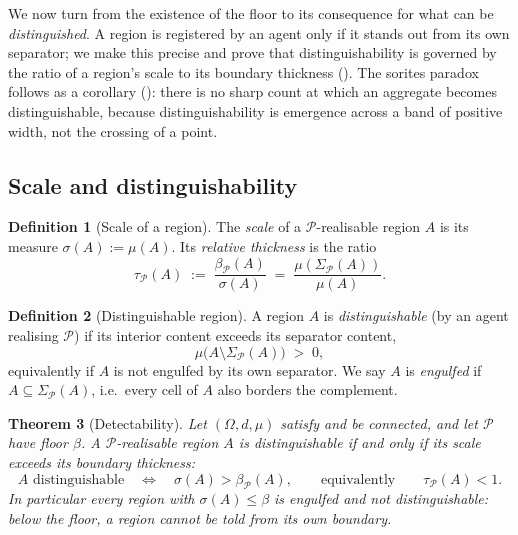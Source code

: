 \documentclass[11pt,a4paper]{article}
\theoremstyle{thmstyle}
\newtheorem{theorem}{Theorem}[section]
\theoremstyle{definition}
\newtheorem{definition}[theorem]{Definition}
\theoremstyle{remark}
\newcommand{\Space}{\Omega}
\newcommand{\thick}{\beta}
\newcommand{\Part}{\mathscr{P}}
\begin{document}
We now turn from the existence of the floor to its consequence for what can be
\emph{distinguished}. A region is registered by an agent only if it stands out
from its own separator; we make this precise and prove that distinguishability is
governed by the ratio of a region's scale to its boundary thickness
(). The sorites paradox follows as a corollary
(): there is no sharp count at which an aggregate becomes
distinguishable, because distinguishability is emergence across a band of
positive width, not the crossing of a point.

\subsection{Scale and distinguishability}

\begin{definition}[Scale of a region]
\label{def:scale}
The \emph{scale} of a $\Part$-realisable region $A$ is its measure
$\sigma(A):=\mu(A)$. Its \emph{relative thickness} is the ratio
\[
\tau_\Part(A)\;:=\;\frac{\thick_\Part(A)}{\sigma(A)}
\;=\;\frac{\mu(\Sigma_\Part(A))}{\mu(A)} .
\]
\end{definition}

\begin{definition}[Distinguishable region]
\label{def:distinguishable}
A region $A$ is \emph{distinguishable} \textup{(}by an agent realising
$\Part$\textup{)} if its interior content exceeds its separator content,
\[
\mu\bigl(A\setminus\Sigma_\Part(A)\bigr)\;>\;0,
\]
equivalently if $A$ is not engulfed by its own separator. We say $A$ is
\emph{engulfed} if $A\subseteq\Sigma_\Part(A)$, i.e.\ every cell of $A$ also
borders the complement.
\end{definition}

\begin{theorem}[Detectability]
\label{thm:detectability}
Let $(\Space,d,\mu)$ satisfy  and be connected, and let $\Part$ have
floor $\thick$. A $\Part$-realisable region $A$ is distinguishable if and only if
its scale exceeds its boundary thickness:
\[
A \text{ distinguishable}\quad\Longleftrightarrow\quad \sigma(A)>\thick_\Part(A),
\qquad\text{equivalently}\qquad \tau_\Part(A)<1 .
\]
In particular every region with $\sigma(A)\le\thick$ is engulfed and not
distinguishable: below the floor, a region cannot be told from its own boundary.
\end{theorem}
\end{document}
